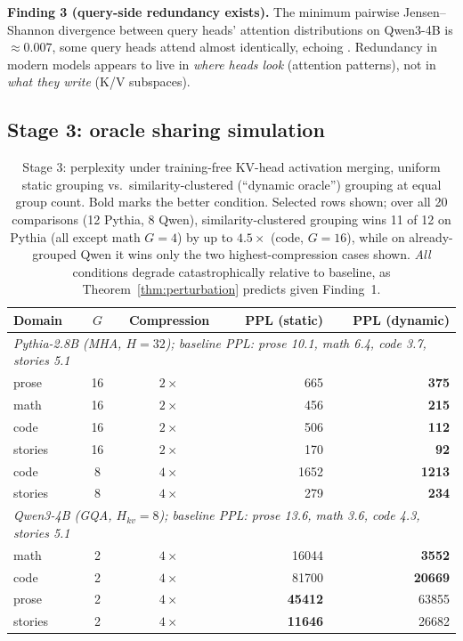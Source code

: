 \documentclass{article}
\begin{document}
\textbf{Finding 3 (query-side redundancy exists).} The minimum pairwise
Jensen--Shannon divergence between query heads' attention distributions on
Qwen3-4B is $\approx 0.007$, some query heads attend almost identically,
echoing \citet{michel2019sixteen,voita2019analyzing}. Redundancy in modern
models appears to live in \emph{where heads look} (attention patterns), not
in \emph{what they write} (K/V subspaces).

\subsection{Stage 3: oracle sharing simulation}

\begin{table}[t]
\centering
\small
\begin{tabular}{lccrr}
\toprule
Domain & $G$ & Compression & PPL (static) & PPL (dynamic) \\
\midrule
\multicolumn{5}{l}{\emph{Pythia-2.8B (MHA, $H{=}32$); baseline PPL: prose 10.1, math 6.4, code 3.7, stories 5.1}}\\
prose & 16 & $2\times$ & 665 & \textbf{375} \\
math & 16 & $2\times$ & 456 & \textbf{215} \\
code & 16 & $2\times$ & 506 & \textbf{112} \\
stories & 16 & $2\times$ & 170 & \textbf{92} \\
code & 8 & $4\times$ & 1652 & \textbf{1213} \\
stories & 8 & $4\times$ & 279 & \textbf{234} \\
\midrule
\multicolumn{5}{l}{\emph{Qwen3-4B (GQA, $H_{kv}{=}8$); baseline PPL: prose 13.6, math 3.6, code 4.3, stories 5.1}}\\
math & 2 & $4\times$ & 16044 & \textbf{3552} \\
code & 2 & $4\times$ & 81700 & \textbf{20669} \\
prose & 2 & $4\times$ & \textbf{45412} & 63855 \\
stories & 2 & $4\times$ & \textbf{11646} & 26682 \\
\bottomrule
\end{tabular}
\caption{Stage 3: perplexity under training-free KV-head activation
merging, uniform static grouping vs.\ similarity-clustered (``dynamic
oracle'') grouping at equal group count. Bold marks the better condition.
Selected rows shown; over all 20 comparisons (12 Pythia, 8 Qwen),
similarity-clustered grouping wins 11 of 12 on Pythia (all except math
$G{=}4$) by up to $4.5\times$ (code, $G{=}16$), while on already-grouped
Qwen it wins only the two highest-compression cases shown. \emph{All}
conditions degrade catastrophically relative to baseline, as
Theorem~\ref{thm:perturbation} predicts given Finding~1.}
\label{tab:stage3}
\end{table}
\end{document}
